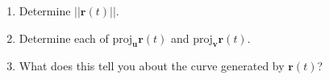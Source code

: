 \documentclass[11pt]{article}
\newenvironment{solution}
  {\textit{Solution.}}
\newcommand{\sol}[1]{
    \begin{customframedproof}[linecolor=orangehdx!75,]
        \begin{solution}
        #1
        \end{solution}
    \end{customframedproof}
}
\newcommand{\vecfuc}[2]{\mb{#1}(#2)}
\newcommand{\proj}{\text{proj}}
\newcommand{\mb}[1]{\mathbf{#1}}
\begin{document}
\begin{enumerate}
\begin{enumerate}
                \sol{

                }
          \item Determine \(||\vecfuc{r}{t}||\).

                \sol{

                }
          \item Determine each of \(\proj_{\mb{u}}\mb{r}(t)\) and \(\proj_{\mb{v}}\mb{r}(t)\).

                \sol{

                }
          \item What does this tell you about the curve generated by \(\mb{r}(t)\)?
     
    \sol{
      
    }
    \end{enumerate}
\end{enumerate}
\end{document}

